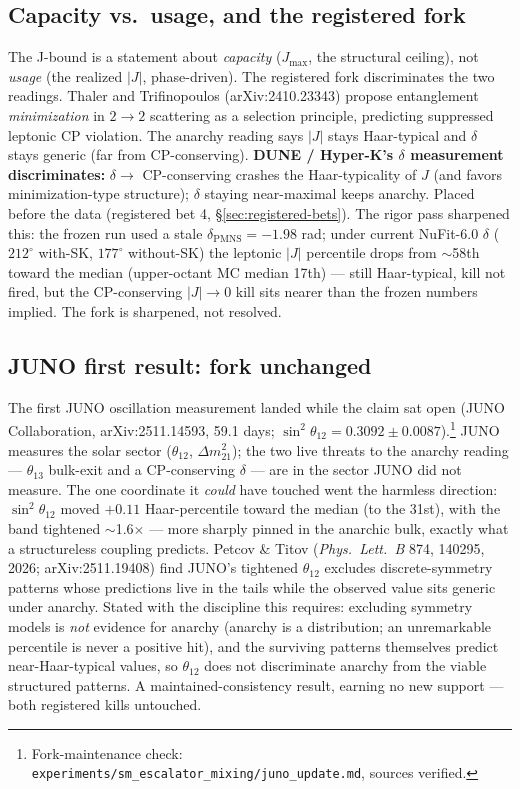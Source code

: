 \documentclass[11pt,a4paper]{article}
\begin{document}
\subsection*{Capacity vs.\ usage, and the registered fork}

The J-bound is a statement about \emph{capacity} ($J_{\max}$, the structural ceiling), not \emph{usage} (the realized $|J|$, phase-driven). The registered fork discriminates the two readings. Thaler and Trifinopoulos (arXiv:2410.23343) propose entanglement \emph{minimization} in $2\to2$ scattering as a selection principle, predicting suppressed leptonic CP violation. The anarchy reading says $|J|$ stays Haar-typical and $\delta$ stays generic (far from CP-conserving). \textbf{DUNE / Hyper-K's $\delta$ measurement discriminates:} $\delta \to$ CP-conserving crashes the Haar-typicality of $J$ (and favors minimization-type structure); $\delta$ staying near-maximal keeps anarchy. Placed before the data (registered bet 4, \S\ref{sec:registered-bets}). The rigor pass sharpened this: the frozen run used a stale $\delta_{\text{PMNS}} = -1.98$ rad; under current NuFit-6.0 $\delta$ ($212^\circ$ with-SK, $177^\circ$ without-SK) the leptonic $|J|$ percentile drops from $\sim$58th toward the median (upper-octant MC median 17th) --- still Haar-typical, kill not fired, but the CP-conserving $|J|\to 0$ kill sits nearer than the frozen numbers implied. The fork is sharpened, not resolved.

\subsection*{JUNO first result: fork unchanged}

The first JUNO oscillation measurement landed while the claim sat open (JUNO Collaboration, arXiv:2511.14593, 59.1 days; $\sin^2\theta_{12} = 0.3092 \pm 0.0087$).\footnote{Fork-maintenance check: \texttt{experiments/sm\_escalator\_mixing/juno\_update.md}, sources verified.} JUNO measures the solar sector ($\theta_{12}$, $\Delta m^2_{21}$); the two live threats to the anarchy reading --- $\theta_{13}$ bulk-exit and a CP-conserving $\delta$ --- are in the sector JUNO did not measure. The one coordinate it \emph{could} have touched went the harmless direction: $\sin^2\theta_{12}$ moved $+0.11$ Haar-percentile toward the median (to the 31st), with the band tightened $\sim$1.6$\times$ --- more sharply pinned in the anarchic bulk, exactly what a structureless coupling predicts. Petcov \& Titov (\emph{Phys.\ Lett.\ B} 874, 140295, 2026; arXiv:2511.19408) find JUNO's tightened $\theta_{12}$ excludes discrete-symmetry patterns whose predictions live in the tails while the observed value sits generic under anarchy. Stated with the discipline this requires: excluding symmetry models is \emph{not} evidence for anarchy (anarchy is a distribution; an unremarkable percentile is never a positive hit), and the surviving patterns themselves predict near-Haar-typical values, so $\theta_{12}$ does not discriminate anarchy from the viable structured patterns. A maintained-consistency result, earning no new support --- both registered kills untouched.
\end{document}
